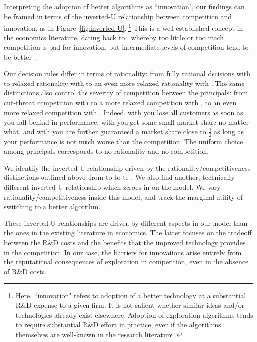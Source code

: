 Interpreting the adoption of better algorithms as ``innovation", our findings can be framed in terms of the inverted-U relationship between competition and innovation, as in Figure~\ref{fig:inverted-U}.%
\footnote{Here, ``innovation" refers to adoption of a better technology at a substantial R\&D expense to a given firm. It is not salient whether similar ideas and/or technologies already exist elsewhere. Adoption of exploration algorithms tends to require substantial R\&D effort in practice, even if the algorithms themselves are well-known in the research literature \citep[\eg see][]{DS-arxiv}.}
This is a well-established concept in the economics literature, dating back to \cite{Schumpeter-42}, whereby too little or too much competition is bad for innovation, but intermediate levels of competition tend to be better \citep[\eg][]{Aghion-QJE05,Vives-08}.

Our decision rules differ in terms of rationality: from fully rational decisions with \HardMax to relaxed rationality with \HardMaxRandom to an even more relaxed rationality with \SoftMaxRandom. The same distinctions also control the severity of competition between the principals: from cut-throat competition with \HardMax to a more relaxed competition with \HardMaxRandom, to an even more relaxed competition with \SoftMaxRandom. Indeed, with \HardMax you lose all customers as soon as you fall behind in performance, with \HardMaxRandom you get some small market share no matter what, and with \SoftMaxRandom you are further guaranteed a market share close to $\tfrac12$ as long as your performance is not much worse than the competition. The uniform choice among principals corresponds to no rationality and no competition.

We identify the inverted-U relationship driven by the rationality/competitiveness distinctions outlined above: from \HardMax to \HardMaxRandom to \SoftMaxRandom to \Uniform. We also find another, technically different inverted-U relationship which zeroes in on the \HardMaxRandom model. We vary rationality/competitiveness inside this model, and track the marginal utility of switching to a better algorithm.

These inverted-U relationships are driven by different aspects in our model than the ones in the existing literature in economics. The latter focuses on the tradeoff between the R\&D costs and the benefits that the improved technology provides in the competition. In our case, the barriers for innovations arise entirely from the reputational consequences of exploration in competition, even in the absence of R\&D costs.

